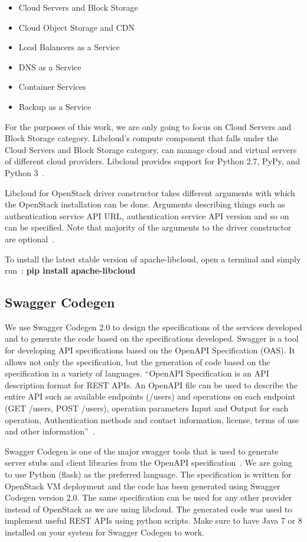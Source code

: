 \begin{itemize}
\item Cloud Servers and Block Storage
\item Cloud Object Storage and CDN
\item Load Balancers as a Service
\item DNS as a Service
\item Container Services
\item Backup as a Service
\end{itemize}

For the purposes of this work, we are only going to focus on Cloud Servers
and Block Storage category. Libcloud's compute component that falls under the
Cloud Servers and Block Storage category, can manage cloud and virtual servers
of different cloud providers. Libcloud provides support for Python 2.7, PyPy,
and Python 3~\cite{hid-sp18-516-www-libcloud-compute}. 

Libcloud for OpenStack driver constructor takes different arguments with which
the OpenStack installation can be done. Arguments describing things such as
authentication service API URL, authentication service API version and so on 
can be specified. Note that majority of the arguments to the driver 
constructor are optional~\cite{hid-sp18-516-www-libcloud-openstack}. 

To install the latest stable version of apache-libcloud, open a terminal and
simply run~\cite{hid-sp18-516-www-libcloud}:
\textbf{pip install apache-libcloud}

\subsection{Swagger Codegen}
We use Swagger Codegen 2.0 to design the specifications of the
services developed and to generate the code based on the specifications
developed. Swagger is a tool for developing API specifications based on the
OpenAPI Specification (OAS). It allows not only the specification, but the
generation of code based on the specification in a variety of languages. 
``OpenAPI Specification is an API description format for REST APIs. An OpenAPI 
file can be used to describe the entire API such as available endpoints 
(/users) and operations on each endpoint (GET /users, POST /users), operation 
parameters Input and Output for each operation, Authentication methods and 
contact information, license, terms of use and other
information''~\cite{hid-sp18-516-www-swagger}. 

Swagger Codegen is one of the major swagger tools that is used to generate
server stubs and client libraries from the OpenAPI
specification~\cite{hid-sp18-516-www-swagger}. We are going to use Python
(flask) as the preferred language. The specification is written for OpenStack 
VM deployment and the code has been generated using Swagger Codegen version 
2.0. The same specification can be used for any other provider instead of 
OpenStack as we are using libcloud. The generated code was used to implement 
useful REST APIs using python scripts. Make sure to have Java 7 or 8 installed 
on your system for Swagger Codegen to work. 

